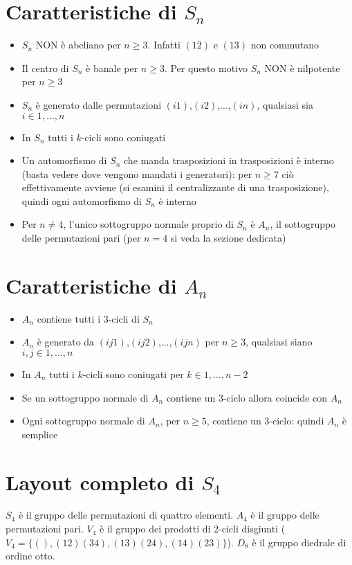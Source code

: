 \documentclass[a4paper,NoNotes,GeneralMath]{stdmdoc}
\begin{document}
	\section*{Caratteristiche di $S_n$}
	\begin{itemize}
		\item $S_n$ NON è abeliano per $n \ge 3$. Infatti $(1 2)$ e $(1 3)$ non commutano
		\item Il centro di $S_n$ è banale per $n \ge 3$. Per questo motivo $S_n$ NON è nilpotente per $n \ge 3$
		\item $S_n$ è generato dalle permutazioni $(i 1)$,$(i 2)$,...,$(i n)$, qualsiasi sia $i \in {1,...,n}$
		\item In $S_n$ tutti i $k$-cicli sono coniugati
		\item Un automorfismo di $S_n$ che manda trasposizioni in trasposizioni è interno (basta vedere dove vengono mandati i generatori): per $n \ge 7$ ciò effettivamente avviene (si esamini il 			centralizzante di una trasposizione), quindi ogni automorfismo di $S_n$ è interno
		\item Per $n \ne 4$, l'unico sottogruppo normale proprio di $S_n$ è $A_n$, il sottogruppo delle permutazioni pari (per $n=4$ si veda la sezione dedicata)
	\end{itemize}

	\section*{Caratteristiche di $A_n$}
	\begin{itemize}
		\item $A_n$ contiene tutti i $3$-cicli di $S_n$
		\item $A_n$ è generato da $(i j 1)$,$(i j 2)$,...,$(i j n)$ per $n \ge 3$, qualsiasi siano $i,j \in {1,...,n}$
		\item In $A_n$ tutti i $k$-cicli sono coniugati per $k \in {1,...,n-2}$
		\item Se un sottogruppo normale di $A_n$ contiene un $3$-ciclo allora coincide con $A_n$
		\item Ogni sottogruppo normale di $A_n$, per $n \ge 5$, contiene un $3$-ciclo: quindi $A_n$ è semplice
	\end{itemize}

	\section*{Layout completo di $S_4$}
	$S_4$ è il gruppo delle permutazioni di quattro elementi. $A_4$ è il gruppo delle permutazioni pari. $V_4$ è il gruppo dei prodotti di 2-cicli disgiunti ($V_4 = \{(), (12)(34), (13)(24), (14)(23)\}$). $D_8$ è il gruppo diedrale di ordine otto.
\end{document}
